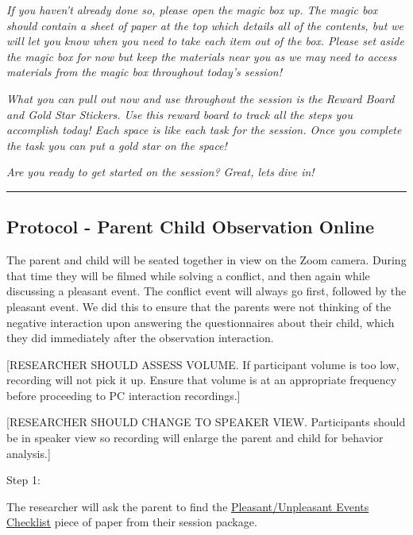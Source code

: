 \documentclass[]{book}
\begin{document}
\emph{If you haven't already done so, please open the magic box up. The magic box should contain a sheet of paper at the top which details all of the contents, but we will let you know when you need to take each item out of the box. Please set aside the magic box for now but keep the materials near you as we may need to access materials from the magic box throughout today's session!}

\emph{What you can pull out now and use throughout the session is the Reward Board and Gold Star Stickers. Use this reward board to track all the steps you accomplish today! Each space is like each task for the session. Once you complete the task you can put a gold star on the space!}

\emph{Are you ready to get started on the session? Great, lets dive in!}

\begin{center}\rule{0.5\linewidth}{0.5pt}\end{center}

\hypertarget{protocol---parent-child-observation-online-2}{%
\subsection{Protocol - Parent Child Observation Online}\label{protocol---parent-child-observation-online-2}}

The parent and child will be seated together in view on the Zoom camera. During that time they will be filmed while solving a conflict, and then again while discussing a pleasant event. The conflict event will always go first, followed by the pleasant event. We did this to ensure that the parents were not thinking of the negative interaction upon answering the questionnaires about their child, which they did immediately after the observation interaction.

{[}RESEARCHER SHOULD ASSESS VOLUME. If participant volume is too low, recording will not pick it up. Ensure that volume is at an appropriate frequency before proceeding to PC interaction recordings.{]}

{[}RESEARCHER SHOULD CHANGE TO SPEAKER VIEW. Participants should be in speaker view so recording will enlarge the parent and child for behavior analysis.{]}

Step 1:

The researcher will ask the parent to find the \href{https://ucla.app.box.com/file/630327764749}{Pleasant/Unpleasant Events Checklist} piece of paper from their session package.
\end{document}
